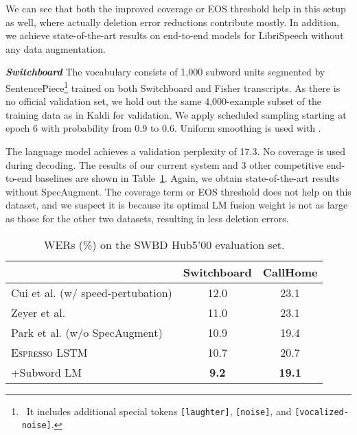 \documentclass{article}
\def\espresso{\textsc{Espresso}\xspace}
\begin{document}
We can see that both the improved coverage or EOS threshold help in this setup as well, where actually deletion error reductions contribute mostly. In addition, we achieve state-of-the-art results on end-to-end models for LibriSpeech without any data augmentation.

\vspace{0.2cm}
\noindent \textbf{\textit{Switchboard}}\quad
The vocabulary consists of 1,000 subword units segmented by SentencePiece\footnote{~It includes additional special tokens \texttt{[laughter]}, \texttt{[noise]}, and \texttt{[vocalized-noise]}.} trained on both Switchboard and Fisher transcripts. As there is no official validation set, we hold out the same 4,000-example subset of the training data as in Kaldi for validation. We apply scheduled sampling starting at epoch 6 with probability from 0.9 to 0.6. Uniform smoothing is used with .

The language model achieves a validation perplexity of 17.3. No coverage is used during decoding. The results of our current system and 3 other competitive end-to-end baselines are shown in Table~\ref{tab:swbd_lstm}. Again, we obtain state-of-the-art results without SpecAugment. The coverage term or EOS threshold does not help on this dataset, and we suspect it is because its optimal LM fusion weight is not as large as those for the other two datasets, resulting in less deletion errors.

\begin{table}[tb]
  \caption{WERs (\%) on the SWBD Hub5'00 evaluation set.}
  \label{tab:swbd_lstm}
  \centering
  \begin{adjustbox}{max width=\linewidth}
  \begin{tabular}{l c c}
    \toprule
    & Switchboard & CallHome \\
    \midrule
    Cui et al. \cite{cui2018improving} (w/ speed-pertubation) & 12.0 & 23.1 \\
    Zeyer et al. \cite{zeyer2018comprehensive} & 11.0 & 23.1 \\
    Park et al. \cite{specaugment} (w/o SpecAugment) & 10.9 & 19.4 \\
    \midrule
    \espresso LSTM & 10.7 & 20.7 \\
    \quad+Subword LM & \textbf{9.2} & \textbf{19.1} \\
    \bottomrule
  \end{tabular}
  \end{adjustbox}
\end{table}
\end{document}
